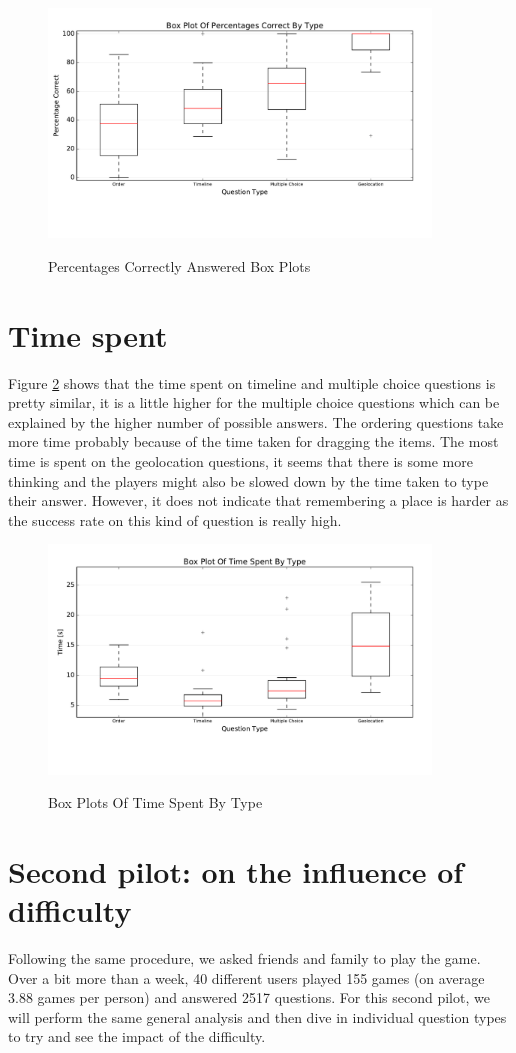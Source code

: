 \begin{figure}
\centering
{\includegraphics[width=4in]{images/pilot_1_boxplot.pdf}}
\caption{Percentages Correctly Answered Box Plots}
\label{fig:p1Boxes}
\end{figure}

\section{Time spent}
Figure \ref{fig:p1BoxesTime} shows that the time spent on timeline and multiple choice questions is pretty similar, it is a little higher for the multiple choice questions which can be explained by the higher number of possible answers. The ordering questions take more time probably because of the time taken for dragging the items. The most time is spent on the geolocation questions, it seems that there is some more thinking and the players might also be slowed down by the time taken to type their answer. However, it does not indicate that remembering a place is harder as the success rate on this kind of question is really high.
\begin{figure}
\centering
{\includegraphics[width=4in]{images/pilot_1_boxplot_time.pdf}}
\caption{Box Plots Of Time Spent By Type}
\label{fig:p1BoxesTime}
\end{figure}

\section{Second pilot: on the influence of difficulty}
Following the same procedure, we asked friends and family to play the game. Over a bit more than a week, 40 different users played 155 games (on average 3.88 games per person) and answered 2517 questions. For this second pilot, we will perform the same general analysis and then dive in individual question types to try and see the impact of the difficulty.

